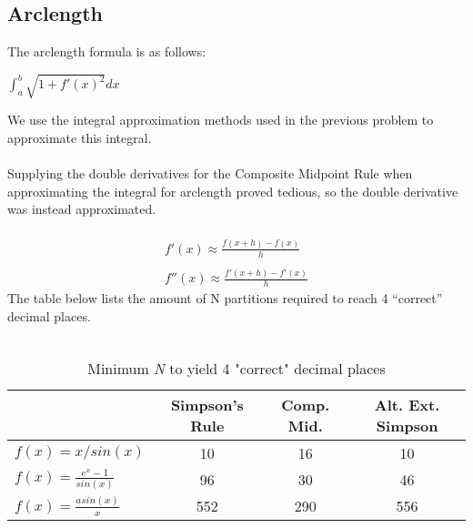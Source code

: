 \documentclass[a4paper12pt,titlepage]{article}
\begin{document}
    \subsection{Arclength}
    The arclength formula is as follows:
    \begin{center}
     $\int_{a}^{b} \sqrt{1+f'(x)^{2}}  dx$
    \end{center}
    We use the integral approximation methods used in the previous problem to approximate this integral.\\ \\ 
    Supplying the double derivatives for the Composite Midpoint Rule when approximating the integral for arclength proved tedious, so the double derivative was instead approximated. \\ \\
    \begin{equation}
    \begin{split}
      f'(x) \approx \frac{f(x+h)-f(x)}{h} \\ \\
      f''(x) \approx \frac{f'(x+h)-f'(x)}{h}
     \end{split}
    \end{equation}
    The table below lists the amount of N partitions required to reach 4 “correct” decimal places. \\ \\

        \begin{table}[h!]
          \begin{center}
            \caption{Minimum \textit{N} to yield 4 "correct" decimal places}
            \label{tab:table2}
            \begin{tabular}{|l|c|c|c|}
              \toprule
              \textbf{} & \textbf{Simpson's Rule} & \textbf{Comp. Mid.} & \textbf{Alt. Ext. Simpson}\\
              \hline
              $f(x) = x/sin(x)$ & 10 & 16 & 10\\
              \hline
              $f(x) = \frac{e^x-1}{sin(x)}$ & 96 & 30 & 46\\
              \hline
              $f(x) = \frac{asin(x)}{x}$ & 552 & 290 & 556\\
              \hline
            \end{tabular}
          \end{center}
        \end{table}
    \clearpage
\end{document}
